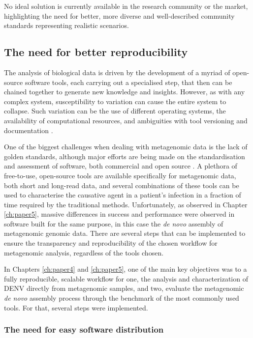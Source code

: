 No ideal solution is currently available in the research community or the market, highlighting the need for better, more diverse and well-described community standards representing realistic scenarios. 


\subsection{The need for better reproducibility}

The analysis of biological data is driven by the development of a myriad of open-source software tools, each carrying out a specialised step, that then can be chained together to generate new knowledge and insights. However, as with any complex system, susceptibility to variation can cause the entire system to collapse. Such variation can be the use of different operating systems, the availability of computational resources, and ambiguities with tool versioning and documentation \citep{wratten_reproducible_2021}. 

One of the biggest challenges when dealing with metagenomic data is the lack of golden standards, although major efforts are being made on the standardisation and assessment of software, both commercial and open source \citep{angers-loustau_challenges_2018, gruening_recommendations_2019, sczyrba_critical_2017, couto_critical_2018}. A plethora of free-to-use, open-source tools are available specifically for metagenomic data, both short and long-read data, and several combinations of these tools can be used to characterise the causative agent in a patient's infection in a fraction of time required by the traditional methods. Unfortunately, as observed in Chapter \ref{ch:paper5}, massive differences in success and performance were observed in software built for the same purpose, in this case the \textit{de novo} assembly of metagenomic genomic data. There are several steps that can be implemented to ensure the transparency and reproducibility of the chosen workflow for metagenomic analysis, regardless of the tools chosen. 

In Chapters \ref{ch:paper4} and \ref{ch:paper5}, one of the main key objectives was to a fully reproducible, scalable workflow for one, the analysis and characterization of \ac{DENV} directly from metagenomic samples, and two, evaluate the metagenomic \textit{de novo} assembly process through the benchmark of the most commonly used tools. For that, several steps were implemented.

\subsubsection{The need for easy software distribution}

